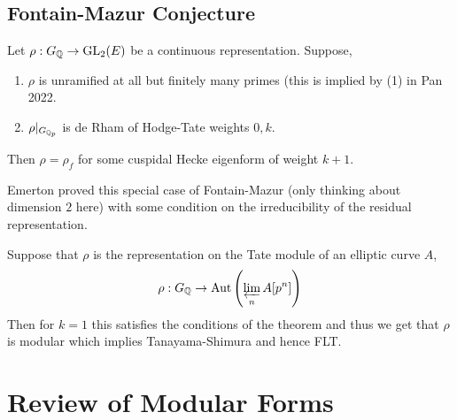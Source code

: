 \documentclass[12pt]{article}
\begin{document}
\subsection{Fontain-Mazur Conjecture}

Let $\rho : G_{\mathbb{Q}} \to \mathrm{GL}_2(E)$ be a continuous representation. Suppose,
\begin{enumerate}
\item $\rho$ is unramified at all but finitely many primes (this is implied by (1) in Pan 2022. 
\item $\rho|_{G_{\mathbb{Q}_p}}$ is de Rham of Hodge-Tate weights $0,k$.
\end{enumerate}
Then $\rho = \rho_f$ for some cuspidal Hecke eigenform of weight $k+1$. 

\begin{rmk}
Emerton proved this special case of Fontain-Mazur (only thinking about dimension $2$ here) with some condition on the irreducibility of the residual representation. 
\end{rmk}

Suppose that $\rho$ is the representation on the Tate module of an elliptic curve $A$,
\[ \rho : G_{\mathbb{Q}} \to \mathrm{Aut} \left( \varprojlim_n A[p^n] \right) \]
Then for $k = 1$ this satisfies the conditions of the theorem and thus we get that $\rho$ is modular which implies Tanayama-Shimura and hence FLT. 

\section{Review of Modular Forms}

\newcommand{\cS}{\mathcal{S}}
\end{document}

